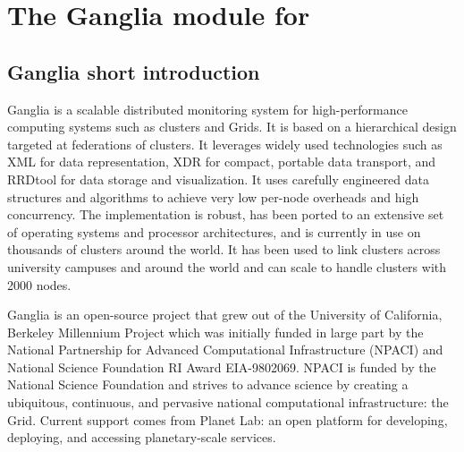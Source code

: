 \chapter{The Ganglia module for \grudu}

\section{Ganglia short introduction}

Ganglia is a scalable distributed monitoring system for high-performance
computing systems such as clusters and Grids. It is based on a hierarchical
design targeted at federations of clusters. It leverages widely used
technologies such as XML for data representation, XDR for compact, portable
data transport, and RRDtool for data storage and visualization. It uses
carefully engineered data structures and algorithms to achieve very low
per-node overheads and high concurrency. The implementation is robust, has been
ported to an extensive set of operating systems and processor architectures,
and is currently in use on thousands of clusters around the world. It has been
used to link clusters across university campuses and around the world and can
scale to handle clusters with 2000 nodes.          

Ganglia is an open-source project that grew out of the University of
California, Berkeley Millennium Project which was initially funded in large
part by the National Partnership for Advanced Computational Infrastructure
(NPACI) and National Science Foundation RI Award EIA-9802069. NPACI is funded
by the National Science Foundation and strives to advance science by creating a
ubiquitous, continuous, and pervasive national computational infrastructure:
the Grid. Current support comes from Planet Lab: an open platform for
developing, deploying, and accessing planetary-scale services.       

